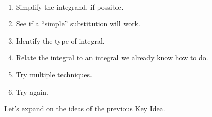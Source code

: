 \clearpage

\begin{keyidea}\label{ki_int_strat}
\mbox{}\\[-2\baselineskip]
\begin{enumerate}
	\item Simplify the integrand, if possible.
	\item See if a ``simple'' substitution will work.
	\item Identify the type of integral.
	\item Relate the integral to an integral we already know how to do.
	\item Try multiple techniques.
	\item Try again.
\end{enumerate}
\end{keyidea}

Let's expand on the ideas of the previous Key Idea.

